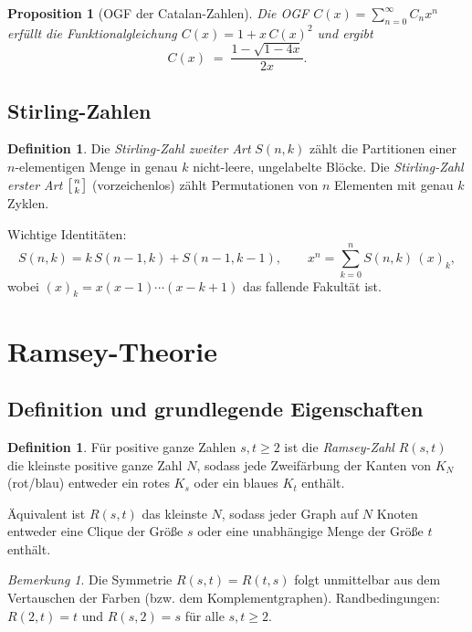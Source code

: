 \documentclass[12pt,a4paper]{amsart}
\newtheorem{proposition}[theorem]{Proposition}
\theoremstyle{definition}
\newtheorem{definition}[theorem]{Definition}
\theoremstyle{remark}
\newtheorem{remark}[theorem]{Bemerkung}
\begin{document}
\begin{proposition}[OGF der Catalan-Zahlen]
Die OGF $C(x) = \sum_{n=0}^{\infty} C_n x^n$ erf\"ullt die Funktionalgleichung
$C(x) = 1 + x\,C(x)^2$ und ergibt
\[
  C(x) \;=\; \frac{1 - \sqrt{1-4x}}{2x}.
\]
\end{proposition}

\subsection{Stirling-Zahlen}

\begin{definition}
Die \emph{Stirling-Zahl zweiter Art} $S(n,k)$ z\"ahlt die Partitionen einer
$n$-elementigen Menge in genau $k$ nicht-leere, ungelabelte Bl\"ocke.
Die \emph{Stirling-Zahl erster Art} $\left[{n\atop k}\right]$ (vorzeichenlos)
z\"ahlt Permutationen von $n$ Elementen mit genau $k$ Zyklen.
\end{definition}

Wichtige Identit\"aten:
\[
  S(n,k) = k\,S(n-1,k) + S(n-1,k-1), \qquad
  x^n = \sum_{k=0}^{n} S(n,k)\,(x)_k,
\]
wobei $(x)_k = x(x-1)\cdots(x-k+1)$ das fallende Fakult\"at ist.

\section{Ramsey-Theorie}

\subsection{Definition und grundlegende Eigenschaften}

\begin{definition}\label{def:ramsey-zahl}
F\"ur positive ganze Zahlen $s, t \ge 2$ ist die \emph{Ramsey-Zahl} $R(s,t)$
die kleinste positive ganze Zahl $N$, sodass jede Zweif\"arbung der Kanten
von $K_N$ (rot/blau) entweder ein rotes $K_s$ oder ein blaues $K_t$ enth\"alt.
\end{definition}

\"Aquivalent ist $R(s,t)$ das kleinste $N$, sodass jeder Graph auf $N$ Knoten
entweder eine Clique der Gr\"o\ss{}e $s$ oder eine unabh\"angige Menge der Gr\"o\ss{}e
$t$ enth\"alt.

\begin{remark}
Die Symmetrie $R(s,t) = R(t,s)$ folgt unmittelbar aus dem Vertauschen der Farben
(bzw. dem Komplementgraphen).  Randbedingungen: $R(2,t) = t$ und $R(s,2) = s$
f\"ur alle $s,t \ge 2$.
\end{remark}
\end{document}
